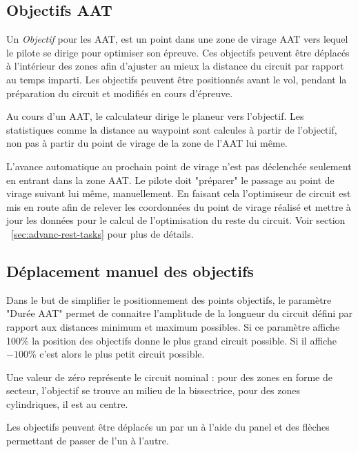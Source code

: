 \subsection*{Objectifs AAT}

Un {\em Objectif} pour les AAT, est un point dans une zone de virage AAT vers lequel le pilote se dirige pour optimiser son épreuve. Ces objectifs peuvent être déplacés à l'intérieur des zones afin d'ajuster au mieux la distance du circuit par rapport au temps imparti. Les objectifs peuvent être positionnés avant le vol, pendant la préparation du circuit et modifiés en cours d'épreuve.

Au cours d'un AAT, le calculateur dirige le planeur vers l'objectif. Les statistiques comme la distance au waypoint sont calcules à partir de l'objectif, non pas à partir du point de virage de la zone de l'AAT lui même.

L'avance automatique au prochain point de virage n'est pas déclenchée seulement en entrant dans la zone AAT. Le pilote doit "préparer" le passage au point de virage suivant lui même, manuellement. En faisant cela l'optimiseur de circuit est mis en route afin de relever les coordonnées du point de virage réalisé et mettre à jour les données pour le calcul de l'optimisation du reste du circuit. Voir section ~\ref{sec:advanc-rest-tasks} pour plus de détails.

\subsection*{Déplacement manuel des objectifs}
Dans le but de simplifier le positionnement des points objectifs, le paramètre "Durée AAT" permet de connaitre l'amplitude de la longueur du circuit défini par rapport aux distances minimum et maximum possibles. Si ce paramètre affiche 100\% la position des objectifs donne le plus grand circuit possible. Si il affiche ~$-100$\% c'est alors le plus petit circuit possible. 

Une valeur de zéro représente le circuit nominal : pour des zones en forme de secteur, l'objectif se trouve au milieu de la bissectrice, pour des zones cylindriques, il est au centre.

Les objectifs peuvent être déplacés un par un à l'aide du panel  et des flèches permettant de passer de l'un à l'autre.\\


